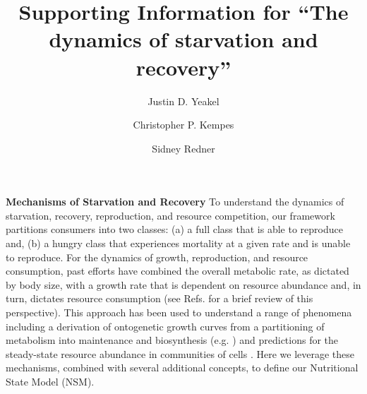 \documentclass[twocolumn,preprintnumbers,amsmath,amssymb,superscriptaddress]{revtex4}
\begin{document}
\author{Justin D. Yeakel} 

\author{Christopher P. Kempes} 

\author{Sidney Redner} 

\title{ Supporting Information for ``The dynamics of starvation and recovery''}%



\maketitle





\clearpage

{\bf Mechanisms of Starvation and Recovery}
To understand the dynamics of starvation, recovery, reproduction, and resource competition, our framework partitions consumers into two classes: (a) a full class that is able to reproduce and, (b) a hungry class that experiences mortality at a given rate and is unable to reproduce. For the dynamics of growth, reproduction, and resource consumption, past efforts have combined the overall metabolic rate, as dictated by body size, with a growth rate that is dependent on resource abundance and, in turn, dictates resource consumption (see Refs. \citep{Kempes:2012hy,kempes2014morphological} for a brief review of this perspective). This approach has been used to understand a range of phenomena including a derivation of ontogenetic growth curves from a partitioning of metabolism into maintenance and biosynthesis (e.g. \citep{West:2001bv,moses2008rmo,hou,Kempes:2012hy}) and predictions for the steady-state resource abundance in communities of cells \citep{kempes2014morphological}. Here we leverage these mechanisms, combined with several additional concepts, to define our Nutritional State Model (NSM).
\end{document}
